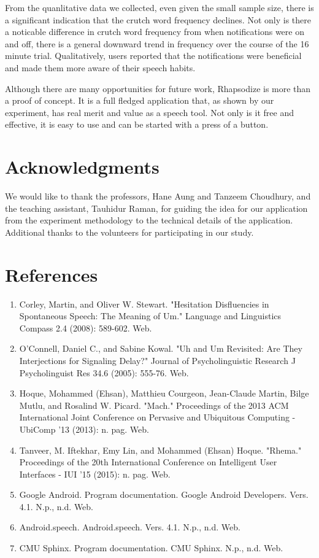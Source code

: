 \documentclass{sigchi}
\begin{document}
From the quanlitative data we collected, even given the small sample size, there is a significant indication that the crutch word frequency declines. Not only is there a noticable difference in crutch word frequency from when notifications were on and off, there is a general downward trend in frequency over the course of the 16 minute trial. Qualitatively, users reported that the notifications were beneficial and made them more aware of their speech habits. 

Although there are many opportunities for future work, Rhapsodize is more than a proof of concept. It is a full fledged application that, as shown by our experiment, has real merit and value as a speech tool. Not only is it free and effective, it is easy to use and can be started with a press of a button. 

\section{Acknowledgments}

We would like to thank the professors, Hane Aung and Tanzeem Choudhury, and the teaching assistant, Tauhidur Raman, for guiding the idea for our application from the experiment methodology to the technical details of the application. Additional thanks to the volunteers for participating in our study. 

\section{References}

\begin{enumerate}
\item Corley, Martin, and Oliver W. Stewart. "Hesitation Disfluencies in Spontaneous Speech: The Meaning of Um." Language and Linguistics Compass 2.4 (2008): 589-602. Web.
\item O’Connell, Daniel C., and Sabine Kowal. "Uh and Um Revisited: Are They Interjections for Signaling Delay?" Journal of Psycholinguistic Research J Psycholinguist Res 34.6 (2005): 555-76. Web.
\item Hoque, Mohammed (Ehsan), Matthieu Courgeon, Jean-Claude Martin, Bilge Mutlu, and Rosalind W. Picard. "Mach." Proceedings of the 2013 ACM International Joint Conference on Pervasive and Ubiquitous Computing - UbiComp '13 (2013): n. pag. Web.
\item Tanveer, M. Iftekhar, Emy Lin, and Mohammed (Ehsan) Hoque. "Rhema." Proceedings of the 20th International Conference on Intelligent User Interfaces - IUI '15 (2015): n. pag. Web.
\item Google Android. Program documentation. Google Android Developers. Vers. 4.1. N.p., n.d. Web.
\item Android.speech. Android.speech. Vers. 4.1. N.p., n.d. Web.
\item CMU Sphinx. Program documentation. CMU Sphinx. N.p., n.d. Web.
\end{enumerate}
\end{document}
